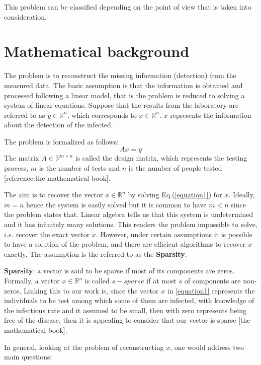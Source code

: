 \documentclass[12pt,a4paper]{article}
\begin{document}
	 This problem can be classified depending on the point of view that is taken into consideration. 
	 \section{Mathematical background}
	 The problem is to reconstruct the missing information (detection) from the measured data. The basic assumption is that the information is obtained and processed following a linear model, that is the problem is reduced to solving a system of linear equations. Suppose that the results from the laboratory are referred to as $ y \in \mathbb{R}^n $,  which corresponds to $ x \in \mathbb{R}^n $. $ x $ represents the information about the detection of the infected. 
	 
	 The problem is formalized as follows: 
	  \begin{equation}\label{equation1}
	  Ax = y 
	  \end{equation} The matrix $ A \in \mathbb{R}^{m \times n}$ \quad is called the design matrix, which represents the testing process, $ m $ is the number of tests and $ n $ is the number of people tested [reference:the mathematical book]. 
	  
	  The aim is to recover the vector $ x \in \mathbb{R}^n $ by solving  Eq.(\ref{equation1}) for $ x $. Ideally, $ m = n $ hence the system is easily solved but it is common to have $ m < n $ since the problem states that. Linear algebra tells us that this system is undetermined and it has infinitely many solutions. This renders the problem impossible to solve, $ i.e. $ recover the exact vector $ x $. However, under certain assumptions it is possible to have a solution of the problem, and there are efficient algorithms to recover $ x $ exactly. The assumption is the referred to as the \textbf{Sparsity}. 
	  
	  \textbf{Sparsity}: a vector is said to be sparse if most of its components are zeros. Formally, a vector $ x \in \mathbb{R}^n $ \quad is called $ s-sparse $ if at most $ s $ of components are non-zeros.  Linking this to our work is, since the vector $ x $ in \ref{equation1} represents the individuals to be test among which some of them are infected, with knowledge of the infectious rate and it assumed to be small, then with zero represents being free of the disease, then it is appealing to consider that our vector is sparse [the mathematical book]. 
	  
	  In general, looking at the problem of reconstructing  $ x $, one would address two main questions: 
	  
\end{document}
